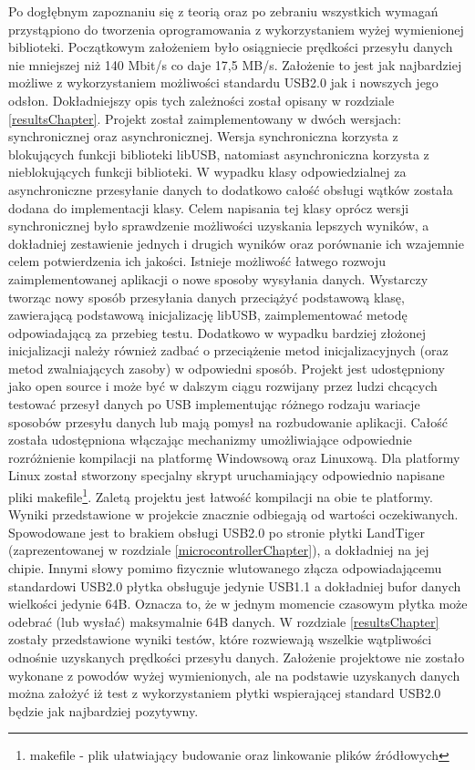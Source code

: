 \documentclass{BscUS}
\begin{document}
\indent Po dogłębnym zapoznaniu się z teorią oraz po zebraniu wszystkich wymagań przystąpiono do tworzenia oprogramowania z wykorzystaniem wyżej wymienionej biblioteki. Początkowym założeniem było osiągniecie prędkości przesyłu danych nie mniejszej niż 140 Mbit/s co daje 17,5 MB/s. Założenie to jest jak najbardziej możliwe z wykorzystaniem możliwości standardu USB2.0 jak i nowszych jego odsłon. Dokładniejszy opis tych zależności został opisany w rozdziale \ref{resultsChapter}. Projekt został zaimplementowany w dwóch wersjach: synchronicznej oraz asynchronicznej. Wersja synchroniczna korzysta z blokujących funkcji biblioteki libUSB, natomiast asynchroniczna korzysta z nieblokujących funkcji biblioteki. W wypadku klasy odpowiedzialnej za asynchroniczne przesyłanie danych to dodatkowo całość obsługi wątków została dodana do implementacji klasy. Celem napisania tej klasy oprócz wersji synchronicznej było sprawdzenie możliwości uzyskania lepszych wyników, a dokładniej zestawienie jednych i drugich wyników oraz porównanie ich wzajemnie celem potwierdzenia ich jakości. Istnieje możliwość łatwego rozwoju zaimplementowanej aplikacji o nowe sposoby wysyłania danych. Wystarczy tworząc nowy sposób przesyłania danych przeciążyć podstawową klasę, zawierającą podstawową inicjalizację libUSB, zaimplementować metodę odpowiadającą za przebieg testu. Dodatkowo w wypadku bardziej złożonej inicjalizacji należy również zadbać o przeciążenie metod inicjalizacyjnych (oraz metod zwalniających zasoby) w odpowiedni sposób.
\newline
\indent Projekt jest udostępniony jako open source i może być w dalszym ciągu rozwijany przez ludzi chcących testować przesył danych po USB implementując różnego rodzaju wariacje sposobów przesyłu danych lub mają pomysł na rozbudowanie aplikacji. Całość została udostępniona włączając mechanizmy umożliwiające odpowiednie rozróżnienie kompilacji na platformę Windowsową oraz Linuxową. Dla platformy Linux został stworzony specjalny skrypt uruchamiający odpowiednio napisane pliki makefile\footnote{makefile - plik ułatwiający budowanie oraz linkowanie plików źródłowych}. Zaletą projektu jest łatwość kompilacji na obie te platformy.
\newline
\indent Wyniki przedstawione w projekcie znacznie odbiegają od wartości oczekiwanych. Spowodowane jest to brakiem obsługi USB2.0 po stronie płytki LandTiger (zaprezentowanej w rozdziale \ref{microcontrollerChapter}), a dokładniej na jej chipie. Innymi słowy pomimo fizycznie wlutowanego złącza odpowiadającemu standardowi USB2.0 płytka obsługuje jedynie USB1.1 a dokładniej bufor danych wielkości jedynie 64B. Oznacza to, że w jednym momencie czasowym płytka może odebrać (lub wysłać) maksymalnie 64B danych. W rozdziale \ref{resultsChapter} zostały przedstawione wyniki testów, które rozwiewają wszelkie wątpliwości odnośnie uzyskanych prędkości przesyłu danych. Założenie projektowe nie zostało wykonane z powodów wyżej wymienionych, ale na podstawie uzyskanych danych można założyć iż test z wykorzystaniem płytki wspierającej standard USB2.0 będzie jak najbardziej pozytywny.
\end{document}
